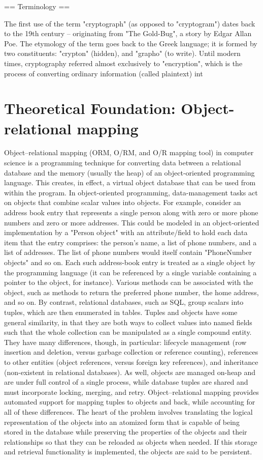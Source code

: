 \documentclass[12pt,a4paper]{report}
\begin{document}
== Terminology ==

The first use of the term "cryptograph" (as opposed to "cryptogram") dates back to the 19th century – originating from "The Gold-Bug", a story by Edgar Allan Poe. The etymology of the term goes back to the Greek language; it is formed by two constituents: "crypton" (hidden), and "grapho" (to write).
Until modern times, cryptography referred almost exclusively to "encryption", which is the process of converting ordinary information (called plaintext) int

\section{Theoretical Foundation: Object-relational mapping}
Object–relational mapping (ORM, O/RM, and O/R mapping tool) in computer science is a programming technique for converting data between a relational database and the memory (usually the heap) of an object-oriented programming language. This creates, in effect, a virtual object database that can be used from within the program.
In object-oriented programming, data-management tasks act on objects that combine scalar values into objects. For example, consider an address book entry that represents a single person along with zero or more phone numbers and zero or more addresses. This could be modeled in an object-oriented implementation by a "Person object" with an attribute/field to hold each data item that the entry comprises: the person's name, a list of phone numbers, and a list of addresses. The list of phone numbers would itself contain "PhoneNumber objects" and so on. Each such address-book entry is treated as a single object by the programming language (it can be referenced by a single variable containing a pointer to the object, for instance). Various methods can be associated with the object, such as methods to return the preferred phone number, the home address, and so on.
By contrast, relational databases, such as SQL, group scalars into tuples, which are then enumerated in tables. Tuples and objects have some general similarity, in that they are both ways to collect values into named fields such that the whole collection can be manipulated as a single compound entity. They have many differences, though, in particular: lifecycle management (row insertion and deletion, versus garbage collection or reference counting), references to other entities (object references, versus foreign key references), and inheritance (non-existent in relational databases). As well, objects are managed on-heap and are under full control of a single process, while database tuples are shared and must incorporate locking, merging, and retry. Object–relational mapping provides automated support for mapping tuples to objects and back, while accounting for all of these differences.
The heart of the problem involves translating the logical representation of the objects into an atomized form that is capable of being stored in the database while preserving the properties of the objects and their relationships so that they can be reloaded as objects when needed. If this storage and retrieval functionality is implemented, the objects are said to be persistent.
\end{document}
